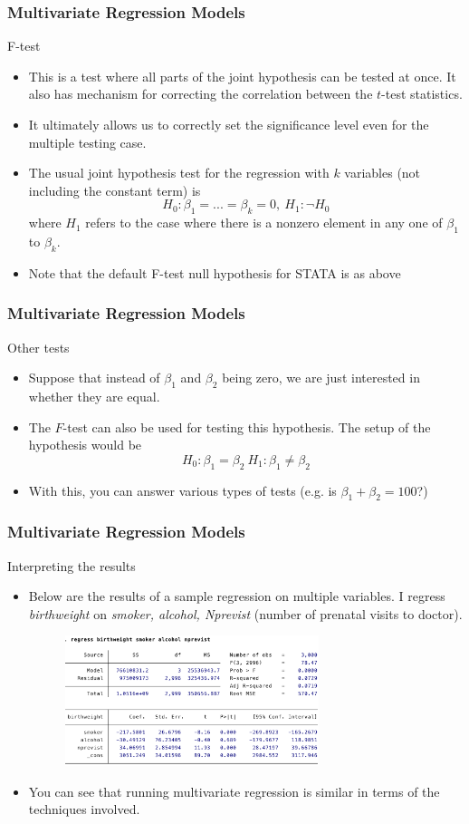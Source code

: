 \documentclass[compress]{beamer}
\begin{document}
\begin{frame}
\frametitle{Multivariate Regression Models}
F-test
\begin{itemize}
\item This is a test where all parts of the joint hypothesis can be tested at once. It also has mechanism for correcting the correlation between the $t$-test statistics.
\item It ultimately allows us to correctly set the significance level even for the multiple testing case.
\item The usual joint hypothesis test for the regression with $k$ variables (not including the constant term) is
\[
H_0: \beta_1 = ... =\beta_k=0, \ H_1:\lnot H_0
\]
where $H_1$ refers to the case where there is a nonzero element in any one of $\beta_1$ to $\beta_k$.
\item Note that the default F-test null hypothesis for STATA is as above
\end{itemize}
\end{frame}


\begin{frame}
\frametitle{Multivariate Regression Models}
Other tests
\begin{itemize}
\item Suppose that instead of $\beta_1$ and $\beta_2$ being zero, we are just interested in whether they are equal.
\item The $F$-test can also be used for testing this hypothesis. The setup of the hypothesis would be
\[
H_0: \beta_1 = \beta_2 \ H_1: \beta_1 \neq \beta_2
\]
\item With this, you can answer various types of tests (e.g. is $\beta_1+\beta_2=100$?)
\end{itemize}
\end{frame}

\begin{frame}
\frametitle{Multivariate Regression Models}
Interpreting the results
\begin{itemize}
\item Below are the results of a sample regression on multiple variables. I regress \textit{birthweight} on \textit{smoker, alcohol, Nprevist} (number of prenatal visits to doctor).
\begin{figure}[H]
\begin{center}
\includegraphics[width=0.7\textwidth]{regoutput.png}
\end{center}
\end{figure}\par\medskip
\item You can see that running multivariate regression is similar in terms of the techniques involved.
\end{itemize}
\end{frame}
\end{document}
